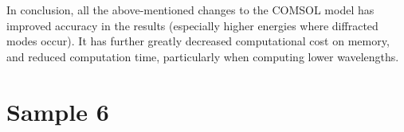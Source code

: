 In conclusion, all the above-mentioned changes to the COMSOL model has improved accuracy in the results (especially higher energies where diffracted modes occur). It has further greatly decreased  computational cost on memory, and reduced computation time, particularly when computing lower wavelengths.







\section{Sample 6}
\label{sec:results_s6}

